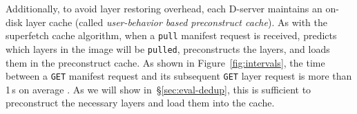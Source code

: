 Additionally, to avoid layer restoring overhead,
each D-server maintains an on-disk layer cache (called \emph{user-behavior based preconstruct cache}).
%
As with the superfetch cache algorithm,
when a \texttt{pull} manifest request is received,
\sysname predicts which layers in the image will be \texttt{pulled},
preconstructs the layers, and loads them in the preconstruct cache.
%
As shown in Figure~\ref{fig:intervals}, the time between a \texttt{GET} manifest request and its
subsequent \texttt{GET} layer request is more than 1\,s on average . As we will show in~\S\ref{sec:eval-dedup}, this is
sufficient to preconstruct the necessary layers and load them into the cache.
